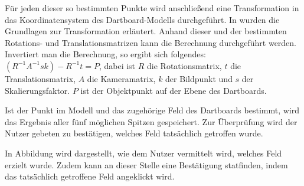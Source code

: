 Für jeden dieser so bestimmten Punkte wird anschließend eine Transformation in das Koordinatensystem des Dartboard-Modells durchgeführt. In  wurden die Grundlagen zur Transformation erläutert. Anhand dieser und der bestimmten Rotations- und Translationsmatrizen kann die Berechnung durchgeführt werden. Invertiert man die Berechnung, so ergibt sich folgendes: 
$(R^{-1}A^{-1}sk)-R^{-1}t=P$, dabei ist $R$ die Rotationsmatrix, $t$ die Translationsmatrix, $A$ die Kameramatrix, $k$ der Bildpunkt und $s$ der Skalierungsfaktor. $P$ ist der Objektpunkt auf der Ebene des Dartboards.

Ist der Punkt im Modell und das zugehörige Feld des Dartboards bestimmt, wird das Ergebnis aller fünf möglichen Spitzen gespeichert. Zur Überprüfung wird der Nutzer gebeten zu bestätigen, welches Feld tatsächlich getroffen wurde. 

In Abbildung  wird dargestellt, wie dem Nutzer vermittelt wird, welches Feld erzielt wurde. Zudem kann an dieser Stelle eine Bestätigung statfinden, indem das tatsächlich getroffene Feld angeklickt wird.


